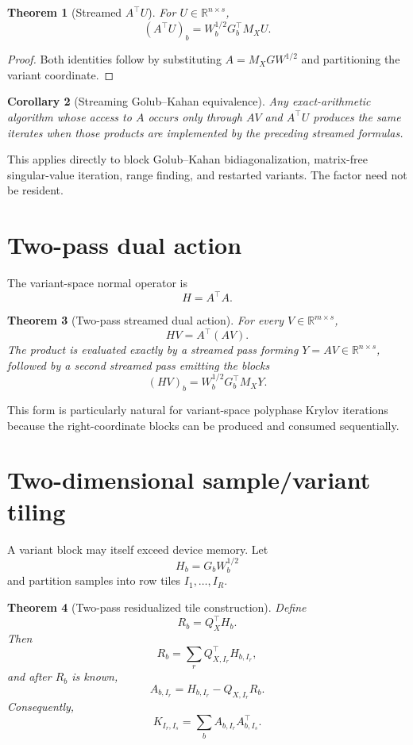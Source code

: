 \documentclass[11pt]{article}
\newtheorem{theorem}{Theorem}[section]
\newtheorem{corollary}[theorem]{Corollary}
\theoremstyle{definition}
\theoremstyle{remark}
\begin{document}
\begin{theorem}[Streamed \(A^\top U\)]
For \(U\in\mathbb R^{n\times s}\),
\[
\boxed{
(A^\top U)_b
=
W_b^{1/2}G_b^\top M_XU.
}
\]
\end{theorem}

\begin{proof}
Both identities follow by substituting
\(A=M_XGW^{1/2}\) and partitioning the variant coordinate.
\end{proof}

\begin{corollary}[Streaming Golub--Kahan equivalence]
Any exact-arithmetic algorithm whose access to \(A\) occurs only through
\(AV\) and \(A^\top U\) produces the same iterates when those products are
implemented by the preceding streamed formulas.
\end{corollary}

This applies directly to block Golub--Kahan bidiagonalization, matrix-free
singular-value iteration, range finding, and restarted variants.  The
factor need not be resident.

\section{Two-pass dual action}

The variant-space normal operator is
\[
H=A^\top A.
\]

\begin{theorem}[Two-pass streamed dual action]
For every \(V\in\mathbb R^{m\times s}\),
\[
\boxed{
HV=A^\top(AV).
}
\]
The product is evaluated exactly by a streamed pass forming
\(Y=AV\in\mathbb R^{n\times s}\), followed by a second streamed pass
emitting the blocks
\[
(HV)_b=W_b^{1/2}G_b^\top M_XY.
\]
\end{theorem}

This form is particularly natural for variant-space polyphase Krylov
iterations because the right-coordinate blocks can be produced and consumed
sequentially.

\section{Two-dimensional sample/variant tiling}

A variant block may itself exceed device memory.  Let
\[
H_b=G_bW_b^{1/2}
\]
and partition samples into row tiles \(I_1,\ldots,I_R\).

\begin{theorem}[Two-pass residualized tile construction]
Define
\[
R_b=Q_X^\top H_b.
\]
Then
\[
\boxed{
R_b
=
\sum_r
Q_{X,I_r}^\top H_{b,I_r},
}
\]
and after \(R_b\) is known,
\[
\boxed{
A_{b,I_r}
=
H_{b,I_r}-Q_{X,I_r}R_b.
}
\]
Consequently,
\[
\boxed{
K_{I_r,I_s}
=
\sum_b
A_{b,I_r}A_{b,I_s}^\top.
}
\]
\end{theorem}
\end{document}
